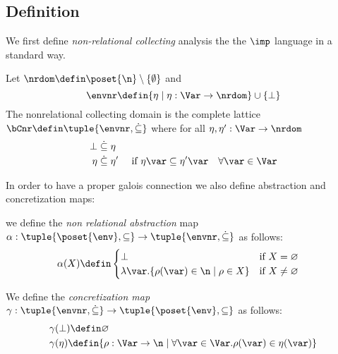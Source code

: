 \subsection{Definition}
\label{sub:nonrel}

We first define \emph{non-relational collecting} analysis the the
\(\imp\) language in a standard way.

\begin{definition}
  Let \(\nrdom \defin \poset{\n} \setminus \{\emptyset\}\) and
  \begin{equation*}
    \envnr \defin \{\eta \mid \eta: \Var \to \nrdom\} \cup \{\bot\}
  \end{equation*}
  The nonrelational collecting domain is the complete lattice
  \(\bCnr \defin \tuple{\envnr,\dot{\subseteq}}\) where for all
  \(\eta,\eta':\Var \to \nrdom\)
  \begin{align*}
    \bot & \mathrel{\dot{\subseteq}} \eta\\
    \eta & \mathrel{\dot{\subseteq}} \eta' & \text{ if } \eta\var\subseteq \eta'\var \quad \forall \var\in \Var
  \end{align*}
\end{definition}

In order to have a proper galois connection we also define abstraction
and concretization maps:

\begin{definition}
  we define the \emph{non relational abstraction} map
  \(\alpha: \tuple{\poset{\env},\subseteq} \to
  \tuple{\envnr,\dot{\subseteq}}\) as follows:
  \begin{align*}
    &\alpha(X) \defin 
      \begin{cases}
        \bot & \text{if }X=\varnothing\\
        \lambda \var. \{\rho(\var) \in \n \mid \rho \in X\} &\text{if }X\neq \varnothing\\
      \end{cases}
  \end{align*}
\end{definition}

\begin{definition}
  We define the \emph{concretization map}
  \(\gamma: \tuple{\envnr,\dot{\subseteq}} \to
  \tuple{\poset{\env},\subseteq}\) as follows:
  \begin{align*}
    &\gamma(\bot) \defin \varnothing\\
    &\gamma(\eta) \defin \{\rho : \Var \to \n \mid \forall \var \in \Var. \rho(\var)\in \eta(\var)\}
  \end{align*}
\end{definition}

